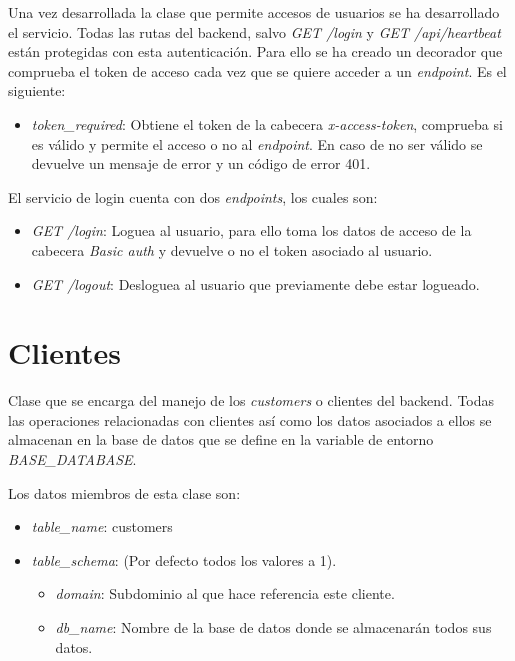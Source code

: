 Una vez desarrollada la clase que permite accesos de usuarios se ha desarrollado el servicio. Todas las rutas del backend, salvo \textit{GET /login} y \textit{GET /api/heartbeat} están protegidas con esta autenticación. Para ello se ha creado un decorador que comprueba el token de acceso cada vez que se quiere acceder a un \textit{endpoint}. Es el siguiente:
\begin{itemize}
	\item \textit{token\_required}: Obtiene el token de la cabecera \textit{x-access-token}, comprueba si es válido y permite el acceso o no al \textit{endpoint}. En caso de no ser válido se devuelve un mensaje de error y un código de error 401.
\end{itemize}


\bigskip
El servicio de login cuenta con dos \textit{endpoints}, los cuales son:
\begin{itemize}
	\item \textit{GET /login}: Loguea al usuario, para ello toma los datos de acceso de la cabecera \textit{Basic auth} y devuelve o no el token asociado al usuario.
	\item \textit{GET /logout}: Desloguea al usuario que previamente debe estar logueado.
\end{itemize}




\section{Clientes}

Clase que se encarga del manejo de los \textit{customers} o clientes del backend. Todas las operaciones relacionadas con clientes así como los datos asociados a ellos se almacenan en la base de datos que se define en la variable de entorno \textit{BASE\_DATABASE}.

\bigskip
Los datos miembros de esta clase son:
\begin{itemize}
	\item \textit{table\_name}: customers
	\item \textit{table\_schema}: (Por defecto todos los valores a 1).
	\begin{itemize}
		\item \textit{domain}: Subdominio al que hace referencia este cliente.
		\item \textit{db\_name}: Nombre de la base de datos donde se almacenarán todos sus datos.
	\end{itemize}
\end{itemize}


